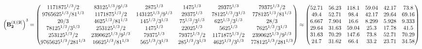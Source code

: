 \documentclass[10pt,a4paper]{article}
\begin{document}
	\[
		\left(\bold{B_2^{(1)[2]}}\right)^{3} = 
		\begin{pmatrix}
			{{1171875^ {1 / 3}}} / {{2}} & {{8}{3125^ {1 / 3}}} / {{9^ {1 / 3}}} & {{28}{75^ {1 / 3}}}{} & {{14}{75^ {1 / 3}}}{} & {{2}{9375^ {1 / 3}}}{} & {{7}{9375^ {1 / 3}}} / {{2}} \\
			{{9765625^ {1 / 3}}} / {{81^ {1 / 3}}} & {{1171875^ {1 / 3}}} / {{2}} & {{14}{3125^ {1 / 3}}} / {{9^ {1 / 3}}} & {{2}{9375^ {1 / 3}}}{} & {{78125^ {1 / 3}}} / {{3^ {1 / 3}}} & {{7}{78125^ {1 / 3}}} / {{81^ {1 / 3}}} \\
			{{20}} / {{3}} & {{4}{625^ {1 / 3}}} / {{81^ {1 / 3}}} & {{14}{5^ {1 / 3}}} / {{3^ {1 / 3}}} & {{7}{5^ {1 / 3}}} / {{3^ {1 / 3}}} & {{625^ {1 / 3}}} / {{3^ {1 / 3}}} & {{28}} / {{3}} \\
			{{78125^ {1 / 3}}} / {{3^ {1 / 3}}} & {{253125^ {1 / 3}}} / {{2}} & {{14}{75^ {1 / 3}}}{} & {{2}{2025^ {1 / 3}}}{} & {{5625^ {1 / 3}}}{} & {{7}{625^ {1 / 3}}} / {{3^ {1 / 3}}} \\
			{{253125^ {1 / 3}}} / {{2}} & {{2}{390625^ {1 / 3}}} / {{9^ {1 / 3}}} & {{7}{9375^ {1 / 3}}}{} & {{7}{9375^ {1 / 3}}} / {{2}} & {{1171875^ {1 / 3}}} / {{2}} & {{2}{390625^ {1 / 3}}} / {{9^ {1 / 3}}} \\
			{{9765625^ {1 / 3}}} / {{2}{81^ {1 / 3}}} & {{16}{625^ {1 / 3}}} / {{81^ {1 / 3}}} & {{56}{5^ {1 / 3}}} / {{3^ {1 / 3}}} & {{28}{5^ {1 / 3}}} / {{3^ {1 / 3}}} & {{4}{625^ {1 / 3}}} / {{3^ {1 / 3}}} & {{7}{78125^ {1 / 3}}} / {{2}{81^ {1 / 3}}} \\
		\end{pmatrix}
		\approx
		\begin{pmatrix}
			52.71    & 56.23    & 118.1    & 59.04    & 42.17    & 73.8     \\
			49.4     & 52.71    & 98.4     & 42.17    & 29.64    & 69.16    \\
			6.667    & 7.904    & 16.6     & 8.299    & 5.928    & 9.333    \\
			29.64    & 31.63    & 59.04    & 25.3     & 17.78    & 41.5     \\
			31.63    & 70.29    & 147.6    & 73.8     & 52.71    & 70.29    \\
			24.7     & 31.62    & 66.4     & 33.2     & 23.71    & 34.58    \\
		\end{pmatrix}
	\]
\end{document}
